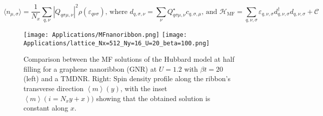 \begin{equation}
\big\langle n_{\mu, \sigma} \big\rangle = \frac{1}{N_x}\sum_{q, \nu} | Q_{q \sigma \mu, \nu} |^2 \rho ( \varepsilon_{q \nu \sigma} ) , \, \text{where} \,\, d_{q, \sigma, \nu} = \sum_\nu Q_{q \sigma \mu, \nu}^\star c_{q ,\sigma, \mu} ,  \, \text{and} \,\, \mathcal{H}_{\text{MF}} = \sum_{q, \nu, \sigma} \varepsilon_{q, \nu, \sigma} d_{q, \nu, \sigma}^\dagger d_{q, \nu, \sigma} + \mathcal{C}
\end{equation}
\begin{figure}[H]
\texttt{[image: Applications/MFnanoribbon.png]}
\hspace{0.1cm}
\texttt{[image: Applications/lattice\_Nx=512\_Ny=16\_U=20\_beta=100.png]}
	\caption[Comparison between the MF solutions of the Hubbard model for a graphene nanoribbon (GNR) and a \acs{TMDNR}. Spin density profile along the ribbon's transverse direction. ]{Comparison between the MF solutions of the Hubbard model at half filling for a graphene nanoribbon (GNR) at $U=1.2$ with $\beta t = 20$ (left) and a \acs{TMDNR}.
	Right: Spin density profile along the ribbon's transverse direction $\left\langle m \right\rangle (y)$, with the inset $\left\langle m \right\rangle (i = N_x y + x))$ showing that the obtained solution is constant along $x$.}
	\label{fig:nanoGraphVsTMD}
\end{figure}

